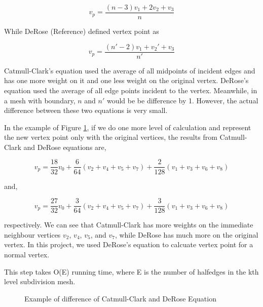 \documentclass[12pt]{article}
\begin{document}
$$v_p=\frac{(n - 3)v_1 + 2v_2 + v_3}{n}$$

While DeRose (Reference) defined vertex point as

$$v_p=\frac{(n' - 2)v_1 + v_2' + v_3}{n'}$$

Catmull-Clark's equation used the average of all midpoints of incident edges and has one more weight on it and one less weight on the original vertex. DeRose's equation used the average of all edge points incident to the vertex. Meanwhile, in a mesh with boundary, $n$ and $n'$ would be be difference by 1. However, the actual difference between these two equations is very small. 

In the example of Figure \ref{figure:differenceCandD}, if we do one more level of calculation and represent the new vertex point only with the original vertices, the results from Catmull-Clark and DeRose equations are,

$$v_p=\frac{18}{32}v_0 + \frac{6}{64}(v_2 + v_4 + v_5 + v_7) + \frac{2}{128}(v_1 + v_3 + v_6 + v_8)$$

and,

$$v_p=\frac{27}{32}v_0 + \frac{3}{64}(v_2 + v_4 + v_5 + v_7) + \frac{3}{128}(v_1 + v_3 + v_6 + v_8)$$

respectively. We can see that Catmull-Clark has more weights on the immediate neighbour vertices $v_2$, $v_4$, $v_5$, and $v_7$, while DeRose has much more on the original vertex. In this project, we used DeRose's equation to calcuate vertex point for a normal vertex.

This step takes O(E) running time, where E is the number of halfedges in the kth level subdivision mesh.

\begin{figure}[ht]
  \centering
  \caption{Example of difference of Catmull-Clark and DeRose Equation}
  \label{figure:differenceCandD}
\end{figure}
\end{document}
